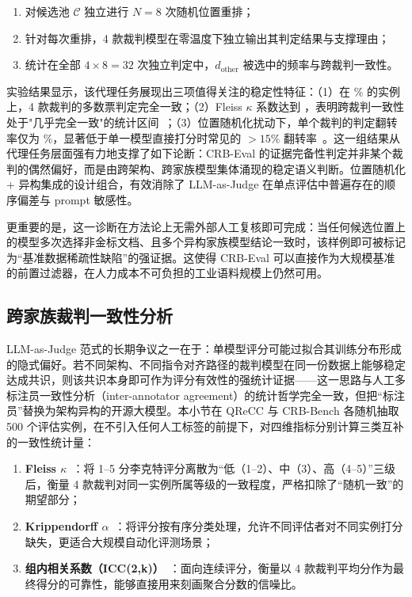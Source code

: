 \begin{enumerate}
    \item 对候选池 $\mathcal{C}$ 独立进行 $N=8$ 次随机位置重排；
    \item 针对每次重排，4 款裁判模型在零温度下独立输出其判定结果与支撑理由；
    \item 统计在全部 $4 \times 8 = 32$ 次独立判定中，$d_{\text{other}}$ 被选中的频率与跨裁判一致性。
\end{enumerate}



实验结果显示，该代理任务展现出三项值得关注的稳定性特征：（1）在 \% 的实例上，4 款裁判的多数票判定完全一致；（2）Fleiss $\kappa$ 系数达到 ，表明跨裁判一致性处于"几乎完全一致"的统计区间~\citep{fleiss1971measuring}；（3）位置随机化扰动下，单个裁判的判定翻转率仅为 \%，显著低于单一模型直接打分时常见的 $>15\%$ 翻转率~\citep{zheng2023judging}。这一组结果从代理任务层面强有力地支撑了如下论断：CRB-Eval 的证据完备性判定并非某个裁判的偶然偏好，而是由跨架构、跨家族模型集体涌现的稳定语义判断。位置随机化 + 异构集成的设计组合，有效消除了 LLM-as-Judge 在单点评估中普遍存在的顺序偏差与 prompt 敏感性。



更重要的是，这一诊断在方法论上无需外部人工复核即可完成：当任何候选位置上的模型多次选择非金标文档、且多个异构家族模型结论一致时，该样例即可被标记为“基准数据稀疏性缺陷”的强证据。这使得 CRB-Eval 可以直接作为大规模基准的前置过滤器，在人力成本不可负担的工业语料规模上仍然可用。



\subsection{跨家族裁判一致性分析}
\label{sec:inter_judge_agreement}



LLM-as-Judge 范式的长期争议之一在于：单模型评分可能过拟合其训练分布形成的隐式偏好。若不同架构、不同指令对齐路径的裁判模型在同一份数据上能够稳定达成共识，则该共识本身即可作为评分有效性的强统计证据——这一思路与人工多标注员一致性分析（inter-annotator agreement）的统计哲学完全一致，但把“标注员”替换为架构异构的开源大模型。本小节在 QReCC 与 CRB-Bench 各随机抽取 500 个评估实例，在不引入任何人工标签的前提下，对四维指标分别计算三类互补的一致性统计量：



\begin{enumerate}
    \item \textbf{Fleiss $\kappa$}~\citep{fleiss1971measuring}：将 1--5 分李克特评分离散为“低（1--2）、中（3）、高（4--5）”三级后，衡量 4 款裁判对同一实例所属等级的一致程度，严格扣除了“随机一致”的期望部分；
    \item \textbf{Krippendorff $\alpha$}~\citep{krippendorff2004content}：将评分按有序分类处理，允许不同评估者对不同实例打分缺失，更适合大规模自动化评测场景；
    \item \textbf{组内相关系数（ICC(2,k)）}~\citep{shrout1979intraclass}：面向连续评分，衡量以 4 款裁判平均分作为最终得分的可靠性，能够直接用来刻画聚合分数的信噪比。
\end{enumerate}



